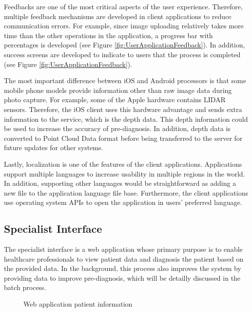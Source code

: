 Feedbacks are one of the most critical aspects of the user experience. Therefore, multiple feedback mechanisms are developed in client applications to reduce communication errors. For example, since image uploading relatively takes more time than the other operations in the application, a progress bar with percentages is developed (see Figure \ref{fig:UserApplicationFeedback}). In addition, success screens are developed to indicate to users that the process is completed (see Figure \ref{fig:UserApplicationFeedback}).

The most important difference between iOS and Android processors is that some mobile phone models provide information other than raw image data during photo capture. For example, some of the Apple hardware contains LIDAR sensors. Therefore, the iOS client uses this hardware advantage and sends extra information to the service, which is the depth data. This depth information could be used to increase the accuracy of pre-diagnosis. In addition, depth data is converted to Point Cloud Data format before being transferred to the server for future updates for other systems.

Lastly, localization is one of the features of the client applications. Applications support multiple languages to increase usability in multiple regions in the world. In addition, supporting other languages would be straightforward as adding a new file to the application language file base. Furthermore, the client applications use operating system APIs to open the application in users' preferred language.

\subsection{Specialist Interface} \label{sec:SpecialistInterface}

The specialist interface is a web application whose primary purpose is to enable healthcare professionals to view patient data and diagnosis the patient based on the provided data. In the background, this process also improves the system by providing data to improve pre-diagnosis, which will be detailly discussed in the batch process. 

\begin{figure}[htbp]
\centering
{}
\caption{Web application patient information}
\label{fig:WebApplicationPatientInfo}
\end{figure}

